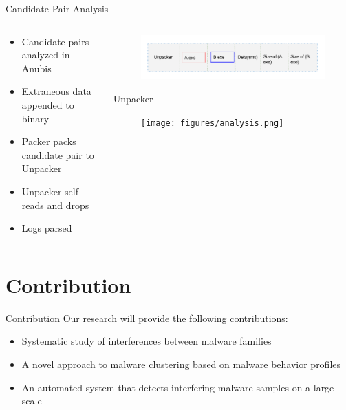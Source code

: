 \documentclass{beamer}
\begin{document}
\begin{frame}[plain,h]{Candidate Pair Analysis}
  \begin{columns}
    \begin{column}{5cm}
    \begin{itemize}
      \item Candidate pairs analyzed in Anubis
      \item Extraneous data appended to binary
      \item Packer packs candidate pair to Unpacker
      \item Unpacker self reads and drops
      \item Logs parsed
    \end{itemize}
    \end{column}
    \begin{column}{5cm}
      \begin{figure}[H]
        \centering
        \includegraphics[scale=0.26]{figures/unpacker.png}
      \label{fig:unpacker}
      \end{figure}
      \tiny \centering Unpacker
      \begin{figure}[h]
        \centering
        \texttt{[image: figures/analysis.png]}
      \end{figure}
    \end{column}
  \end{columns}
\end{frame}


\section{Contribution}
\begin{frame}[h]{Contribution}
Our research will provide the following contributions:
\begin{itemize}
  \item Systematic study of interferences between malware families
  \item A novel approach to malware clustering based on malware behavior profiles
  \item An automated system that detects interfering malware samples on a large scale
\end{itemize}
\end{frame}
\end{document}
